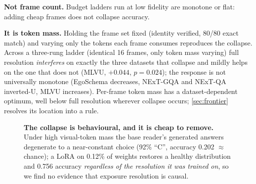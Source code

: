 \documentclass[10pt,twocolumn,letterpaper]{article}
\begin{document}
\noindent\textbf{Not frame count.} Budget ladders run at low fidelity are monotone or flat: adding cheap frames does not collapse accuracy.

\noindent\textbf{It is token mass.} Holding the frame set fixed (identity verified, 80/80 exact match) and varying only the tokens each frame consumes reproduces the collapse. Across a three-rung ladder (identical 16 frames, only token mass varying) full resolution \emph{interferes} on exactly the three datasets that collapse and mildly helps on the one that does not (MLVU, $+0.044$, $p{=}0.024$); the response is not universally monotone (EgoSchema decreases, NExT-GQA and NExT-QA inverted-U, MLVU increases). Per-frame token mass has a dataset-dependent optimum, well below full resolution wherever collapse occurs; \cref{sec:frontier} resolves its location into a rule.

\begin{figure}[t]
\centering
\caption{\textbf{The collapse is behavioural, and it is cheap to remove.} Under high visual-token mass the base reader's generated answers degenerate to a near-constant choice (92\% ``C'', accuracy 0.202 $\approx$ chance); a LoRA on 0.12\% of weights restores a healthy distribution and 0.756 accuracy \emph{regardless of the resolution it was trained on}, so we find no evidence that exposure resolution is causal.}
\label{fig:collapse}
\end{figure}
\end{document}
